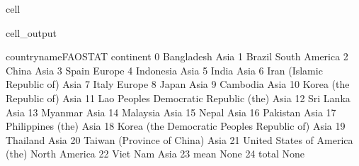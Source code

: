 \documentclass[letterpaper,10pt,english]{jupyterBook}
\begin{document}
\begin{sphinxuseclass}{cell}
\begin{sphinxVerbatimOutput}
\begin{sphinxuseclass}{cell_output}
\begin{sphinxVerbatim}[commandchars=\\\{\}]
                           country\PYGZus{}name\PYGZus{}FAOSTAT      continent  \PYGZbs{}
0                                    Bangladesh           Asia   
1                                        Brazil  South America   
2                                         China           Asia   
3                                         Spain         Europe   
4                                     Indonesia           Asia   
5                                         India           Asia   
6                    Iran (Islamic Republic of)           Asia   
7                                         Italy         Europe   
8                                         Japan           Asia   
9                                      Cambodia           Asia   
10                      Korea (the Republic of)           Asia   
11       Lao People\PYGZsq{}s Democratic Republic (the)           Asia   
12                                    Sri Lanka           Asia   
13                                      Myanmar           Asia   
14                                     Malaysia           Asia   
15                                        Nepal           Asia   
16                                     Pakistan           Asia   
17                            Philippines (the)           Asia   
18  Korea (the Democratic People\PYGZsq{}s Republic of)           Asia   
19                                     Thailand           Asia   
20                   Taiwan (Province of China)           Asia   
21               United States of America (the)  North America   
22                                     Viet Nam           Asia   
23                                         mean           None   
24                                        total           None   


\end{sphinxVerbatim}
\end{sphinxuseclass}
\end{sphinxVerbatimOutput}
\end{sphinxuseclass}
\end{document}
